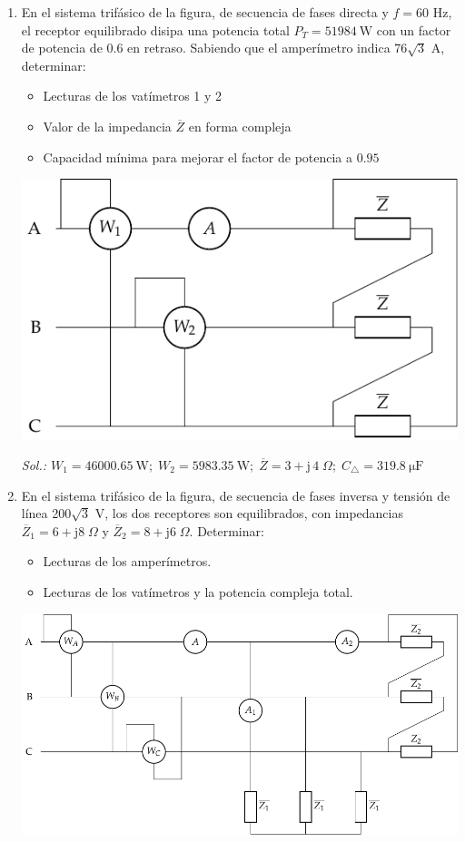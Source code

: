 \begin{enumerate}
\item En el sistema trifásico de la figura, de secuencia de fases
  directa y $f=60$ Hz, el receptor equilibrado disipa una potencia
  total $P_T = \qty{51984}{\watt}$ con un factor de potencia de $0.6$ en
  retraso. Sabiendo que el amperímetro indica 76$\sqrt{3}$ A,
  determinar:
  \begin{itemize}
  \item Lecturas de los vatímetros 1 y 2
  \item Valor de la impedancia $\overline{Z}$ en forma compleja
  \item Capacidad mínima para mejorar el factor de potencia a $0.95$
  \end{itemize}
  \begin{center}
    \includegraphics[width=0.54\linewidth]{../figs/ej4_BT3.pdf}
  \end{center}
  \emph{Sol.:\;
    $ W_1=\qty{46000.65}{\watt};\; W_2=\qty{5983.35}{\watt};\;
    \overline{Z}=3+\mathrm{j}\,4\;\Omega;\; C_{\triangle}=\qty{319.8}{\micro\farad}$}

\item En el sistema trifásico de la figura, de secuencia de fases
  inversa y tensión de línea 200$\sqrt{3}$ V, los dos receptores son
  equilibrados, con impedancias
  $\overline{Z}_1 = 6+\mathrm{j}8\;\Omega$ y
  $\overline{Z}_2 = 8+\mathrm{j}6\;\Omega$. Determinar:
  \begin{itemize}
  \item Lecturas de los amperímetros.
  \item Lecturas de los vatímetros y la potencia compleja total.
  \end{itemize}
  \begin{center}
    \includegraphics[width=.93\linewidth]{../figs/ej5_BT3.pdf}
  \end{center}


\end{enumerate}
